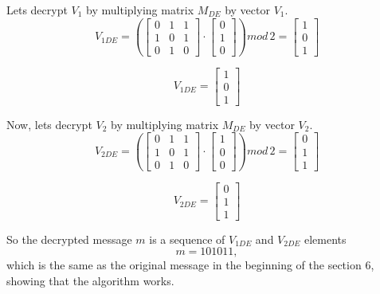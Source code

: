 \documentclass{article}
\begin{document}
        Lets decrypt $V_1$ by multiplying matrix $M_{DE}$ by vector $V_1$.
        $$
        V_{1DE}=
        \left(
        \begin{bmatrix}
        0 & 1 & 1 \\
        1 & 0 & 1 \\
        0 & 1 & 0
        \end{bmatrix} \cdot
        \begin{bmatrix}
        0  \\
        1  \\
        0  
        \end{bmatrix}
        \right)
        mod \, 2
        =
        \begin{bmatrix}
        1  \\
        0  \\
        1  
        \end{bmatrix}
        $$
        
        $$
        V_{1DE}=\begin{bmatrix}
        1  \\
        0  \\
        1  
        \end{bmatrix}$$
        \vspace{5mm}
        
        Now, lets decrypt $V_2$ by multiplying matrix $M_{DE}$ by vector $V_2$.
        $$
        V_{2DE}=
        \left(
        \begin{bmatrix}
        0 & 1 & 1 \\
        1 & 0 & 1 \\
        0 & 1 & 0
        \end{bmatrix} \cdot
        \begin{bmatrix}
        1  \\
        0  \\
        0  
        \end{bmatrix}
        \right)
        mod \, 2
        =
        \begin{bmatrix}
        0  \\
        1  \\
        1  
        \end{bmatrix}
        $$
        
        $$
        V_{2DE}=\begin{bmatrix}
        0  \\
        1  \\
        1  
        \end{bmatrix}$$
        \vspace{5mm}
        
        So the decrypted message $m$ is a sequence of $V_{1DE}$ and $V_{2DE}$ elements
        $$m = 101011,$$
        \indent which is the same as the original message in the beginning of the section 6, showing that the algorithm works.
        
\newpage
\printbibliography %
\end{document}
